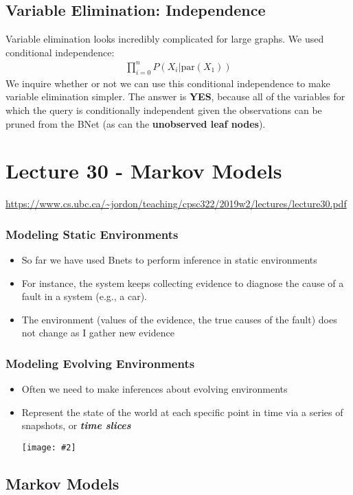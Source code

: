 \documentclass{article}
\newcommand{\centerfig}[2]{\begin{center}\texttt{[image: \#2]}\end{center}}
\begin{document}
\subsection*{Variable Elimination: Independence}
Variable elimination looks incredibly complicated for large graphs. We used conditional independence:
\begin{align*}
\prod_{i = 0}^{n}P(X_i | \text{par}(X_1))
\end{align*}
We inquire whether or not we can use this conditional independence to make variable elimination simpler. The answer is \textbf{\color{Periwinkle}YES}, because all of the variables for which the query is conditionally independent given the observations can be pruned from the BNet (as can the \textbf{\color{Periwinkle}unobserved leaf nodes}).

\newpage
\section*{Lecture 30 - Markov Models}
\url{https://www.cs.ubc.ca/~jordon/teaching/cpsc322/2019w2/lectures/lecture30.pdf}
\subsubsection*{Modeling Static Environments}
\begin{itemize}
	\item So far we have used Bnets to perform inference in static environments
	\item For instance, the system keeps collecting evidence to diagnose the cause of a fault in a system (e.g., a car).
	\item The environment (values of the evidence, the true causes of the fault) does not change as I gather new evidence
\end{itemize}
\subsubsection*{Modeling Evolving Environments}
\begin{itemize}
	\item Often we need to make inferences about evolving environments
	\item Represent the state of the world at each specific point in time via a series of snapshots, or \textbf{\textit{time slices}}
	\centerfig{0.8}{BNet-7}
\end{itemize}

\subsection*{Markov Models}
\end{document}
